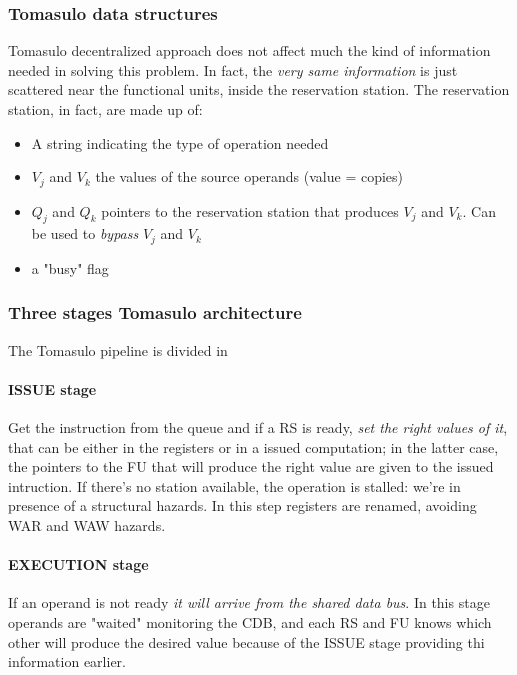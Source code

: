 \documentclass[10pt,a4paper]{article}
\begin{document}
				\subsubsection{Tomasulo data structures}
					Tomasulo decentralized approach does not affect much the kind of information needed in solving this problem. In fact, the \emph{very same information} is just scattered near the functional units, inside the reservation station. The reservation station, in fact, are made up of:
					\begin{itemize}
						\item A string indicating the type of operation needed
						\item $V_j$ and $V_k$ the values of the source operands (value = copies)
						\item $Q_j$ and $Q_k$ pointers to the reservation station that produces $V_j$ and $V_k$. Can be used to \emph{bypass} $V_j$ and $V_k$ 
						\item a "busy" flag
					\end{itemize}
					
			 	\subsubsection{Three stages Tomasulo architecture}
					The Tomasulo pipeline is divided in
					
					\paragraph{ISSUE stage}
						Get the instruction from the queue and if a RS is ready, \emph{set the right values of it}, that can be either in the registers or in a issued computation; in the latter case, the pointers to the FU that will produce the right value are given to the issued intruction. If there's no station available, the operation is stalled: we're in presence of a structural hazards. In this step registers are renamed, avoiding WAR and WAW hazards.
					
					\paragraph{EXECUTION stage}
						If an operand is not ready \emph{it will arrive from the shared data bus}. In this stage operands are "waited" monitoring the CDB, and each RS and FU knows which other will produce the desired value because of the ISSUE stage providing thi information earlier.
						
\end{document}
